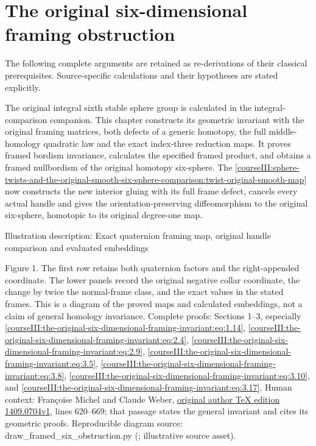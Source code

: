 \section{The original six-dimensional framing obstruction}\label{courseIII:the-original-six-dimensional-framing-invariant:section}

The following complete arguments are retained as re-derivations of their classical prerequisites. Source-specific calculations and their hypotheses are stated explicitly.

The original integral sixth stable sphere group is calculated in the integral-comparison companion. This chapter constructs its geometric invariant with the original framing matrices, both defects of a generic homotopy, the full middle-homology quadratic law and the exact index-three reduction maps. It proves framed bordism invariance, calculates the specified framed product, and obtains a framed nullbordism of the original homotopy six-sphere. The \cref{courseIII:sphere-twists-and-the-original-smooth-six-sphere-comparison:twist-original-smooth-map} now constructs the new interior gluing with its full frame defect, cancels every actual handle and gives the orientation-preserving diffeomorphism to the original six-sphere, homotopic to its original degree-one map.

Illustration description: Exact quaternion framing map, original handle comparison and evaluated embeddings

Figure 1. The first row retains both quaternion factors and the right-appended coordinate. The lower panels record the original negative collar coordinate, the change by twice the normal-frame class, and the exact values in the stated frames. This is a diagram of the proved maps and calculated embeddings, not a claim of general homology invariance. Complete proofs: Sections 1--3, especially \eqref{courseIII:the-original-six-dimensional-framing-invariant:eq:1.14}, \eqref{courseIII:the-original-six-dimensional-framing-invariant:eq:2.4}, \eqref{courseIII:the-original-six-dimensional-framing-invariant:eq:2.9}, \eqref{courseIII:the-original-six-dimensional-framing-invariant:eq:3.5}, \eqref{courseIII:the-original-six-dimensional-framing-invariant:eq:3.8}, \eqref{courseIII:the-original-six-dimensional-framing-invariant:eq:3.10}, and \eqref{courseIII:the-original-six-dimensional-framing-invariant:eq:3.17}. Human context: Françoise Michel and Claude Weber, \href{https://arxiv.org/abs/1409.0704v1}{original author TeX edition 1409.0704v1}, lines 620--669; that passage states the general invariant and cites its geometric proofs. Reproducible diagram source: draw\_framed\_six\_obstruction.py (; illustrative source asset).

